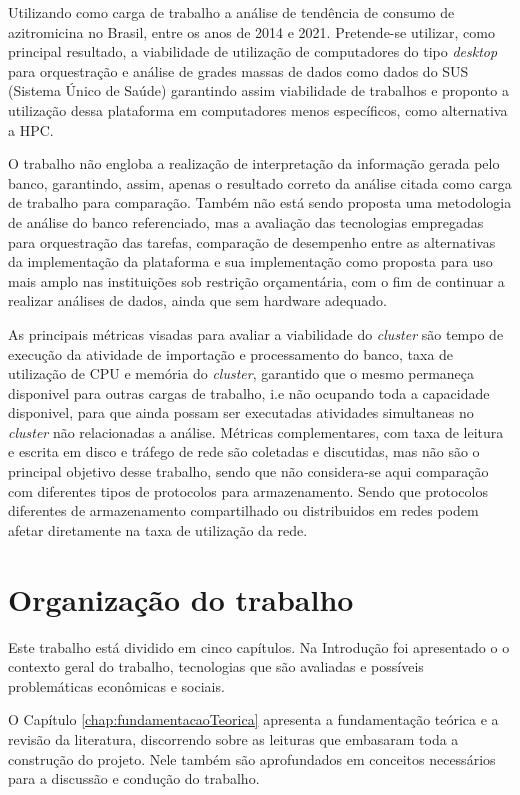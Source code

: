Utilizando como carga de trabalho a análise de tendência de consumo de azitromicina no Brasil, entre os anos de 2014 e 2021. Pretende-se utilizar, como principal resultado, a viabilidade de utilização de computadores do tipo \emph{desktop} para orquestração e análise de grades massas de dados como dados do SUS (Sistema Único de Saúde) garantindo assim viabilidade de trabalhos e proponto a utilização dessa plataforma em computadores menos específicos, como alternativa a HPC.

O trabalho não engloba a realização de interpretação da informação gerada pelo banco, garantindo, assim, apenas o resultado correto da análise citada como carga de trabalho para comparação. Também não está sendo proposta uma metodologia de análise do banco referenciado, mas a avaliação das tecnologias empregadas para orquestração das tarefas, comparação de desempenho entre as alternativas da implementação da plataforma e sua implementação como proposta para uso mais amplo nas instituições sob restrição orçamentária, com o fim de continuar a realizar análises de dados, ainda que sem hardware adequado. 

As principais métricas visadas para avaliar a viabilidade do \emph{cluster} são tempo de execução da atividade de importação e processamento do banco, taxa de utilização de CPU e memória do \emph{cluster}, garantido que o mesmo permaneça disponivel para outras cargas de trabalho, i.e não ocupando toda a capacidade disponivel, para que ainda possam ser executadas atividades simultaneas no \emph{cluster} não relacionadas a análise. Métricas complementares, com taxa de leitura e escrita em disco e tráfego de rede são coletadas e discutidas, mas não são o principal objetivo desse trabalho, sendo que não considera-se aqui comparação com diferentes tipos de protocolos para armazenamento. Sendo que protocolos diferentes de armazenamento compartilhado ou distribuidos em redes podem afetar diretamente na taxa de utilização da rede. 


\section{Organização do trabalho}
\label{sec:organizacaoTrabalho}

Este trabalho está dividido em cinco capítulos. Na Introdução foi apresentado o o contexto geral do trabalho, tecnologias que são avaliadas e possíveis problemáticas econômicas e sociais. 

O Capítulo \ref{chap:fundamentacaoTeorica} apresenta a fundamentação teórica e a revisão da literatura, discorrendo sobre as leituras que embasaram toda a construção do projeto. Nele também são aprofundados em conceitos necessários para a discussão e condução do trabalho. 

